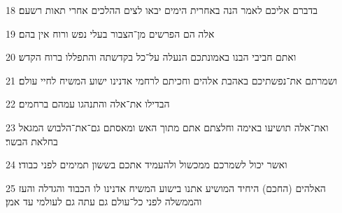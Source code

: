 \par 18 בדברם אליכם לאמר הנה באחרית הימים יבאו לצים ההלכים אחרי תאות רשעם׃
\par 19 אלה הם הפרשים מן־הצבור בעלי נפש ורוח אין בהם׃
\par 20 ואתם חביבי הבנו באמונתכם הנעלה על־כל בקדשתה והתפללו ברוח הקדש׃
\par 21 ושמרתם את־נפשתיכם באהבת אלהים וחכיתם לרחמי אדנינו ישוע המשיח לחיי עולם׃
\par 22 הבדילו את־אלה והתנהגו עמהם ברחמים׃
\par 23 ואת־אלה תושיעו באימה וחלצתם אתם מתוך האש ומאסתם גם־את־הלבוש המגאל בחלאת הבשר׃
\par 24 ואשר יכול לשמרכם ממכשול ולהעמיד אתכם בששון תמימים לפני כבודו׃
\par 25 האלהים (החכם) היחיד המושיע אתנו בישוע המשיח אדנינו לו הכבוד והגדלה והעז והממשלה לפני כל־עולם גם עתה גם לעולמי עד אמן׃


